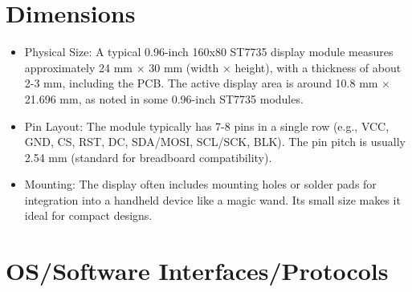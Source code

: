 \section{Dimensions}



\begin{itemize}

	\item Physical Size: A typical 0.96-inch 160x80 ST7735 display module measures approximately 24 mm × 30 mm (width × height), with a thickness of about 2-3 mm, including the PCB. The active display area is around 10.8 mm × 21.696 mm, as noted in some 0.96-inch ST7735 modules.

	\item Pin Layout: The module typically has 7-8 pins in a single row (e.g., VCC, GND, CS, RST, DC, SDA/MOSI, SCL/SCK, BLK). The pin pitch is usually 2.54 mm (standard for breadboard compatibility).

	\item Mounting: The display often includes mounting holes or solder pads for integration into a handheld device like a magic wand. Its small size makes it ideal for compact designs.\cite{Sitronix:2010}

\end{itemize}



\section{OS/Software Interfaces/Protocols}

